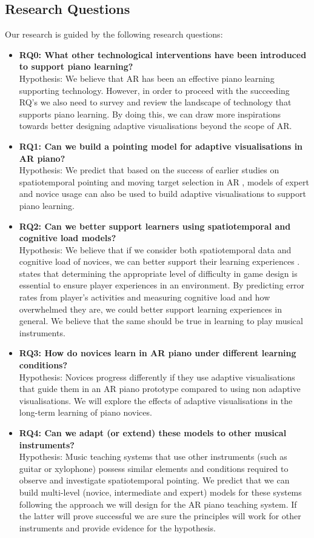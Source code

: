 \documentclass[manuscript,screen]{acmart}
\begin{document}
\subsection{Research Questions}
Our research is guided by the following research questions: 
\begin{itemize}
    \item \textbf{RQ0: What other technological interventions have been introduced to support piano learning?}\\
    Hypothesis: We believe that AR has been an effective piano learning supporting technology. However, in order to proceed with the succeeding RQ's we also need to survey and review the landscape of technology that supports piano learning. By doing this, we can draw more inspirations towards better designing adaptive visualisations beyond the scope of AR. 
    \item \textbf{RQ1: Can we build a pointing model for adaptive visualisations in AR piano?} \\
    Hypothesis: We predict that based on the success of earlier studies on spatiotemporal pointing and moving target selection in AR \cite{lee2016modelling, lee2017boxer, park2020intermittent}, models of expert and novice usage can also be used to build adaptive visualisations to support piano learning. 
    \item \textbf{RQ2: Can we better support learners using spatiotemporal and cognitive load models?}\\
    Hypothesis: We believe that if we consider both spatiotemporal data and cognitive load of novices, we can better support their learning experiences \cite{rikers2004cognitive}. \citet{lee2016website} states that determining the appropriate level of difficulty in game design is essential to ensure player experiences in an environment. By predicting error rates from player's activities and measuring cognitive load and how overwhelmed they are, we could better support learning experiences in general. We believe that the same should be true in learning to play musical instruments.
    \item \textbf{RQ3: How do novices learn in AR piano under different learning conditions?}\\
    Hypothesis: Novices progress differently if they use adaptive visualisations that guide them in an AR piano prototype compared to using non adaptive visualisations. We will explore the effects of adaptive visualisations in the long-term learning of piano novices.
    \item \textbf{RQ4: Can we adapt (or extend) these models to other musical instruments?}\\
    Hypothesis: Music teaching systems that use other instruments (such as guitar or xylophone) possess similar elements and conditions required to observe and investigate spatiotemporal pointing. We predict that we can build multi-level (novice, intermediate and expert) models for these systems following the approach we will design for the AR piano teaching system. If the latter will prove successful we are sure the principles will work for other instruments and provide evidence for the hypothesis. 
\end{itemize}
\end{document}
